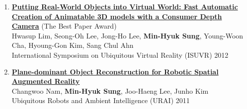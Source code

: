 \documentclass[letterpaper,10pt]{article} %
\newcommand{\blankline}{\quad\pagebreak[2]}
\begin{document}
{{\begin{enumerate}
\item \label{isuvr12}
\href{http://dx.doi.org/10.1109/ISUVR.2012.12}{\textbf{Putting Real-World Objects into Virtual World: Fast Automatic Creation of Animatable 3D models with a Consumer Depth Camera}} (The Best Paper Award)\\
Hwasup Lim, Seong-Oh Lee, Jong-Ho Lee, \textbf{Min-Hyuk Sung}, Young-Woon Cha, Hyoung-Gon Kim, Sang Chul Ahn \\
International Symposium on Ubiquitous Virtual Reality (ISUVR) 2012\\
\blankline

\item \label{urai11}
\href{http://dx.doi.org/10.1109/URAI.2011.6145896}{\textbf{Plane-dominant Object Reconstruction for Robotic Spatial Augmented Reality}} \\
Changwoo Nam, \textbf{Min-Hyuk Sung}, Joo-Haeng Lee, Junho Kim \\
Ubiquitous Robots and Ambient Intelligence (URAI) 2011 \\
\blankline

%

\end{enumerate}

\blankline



}}
\end{document}
